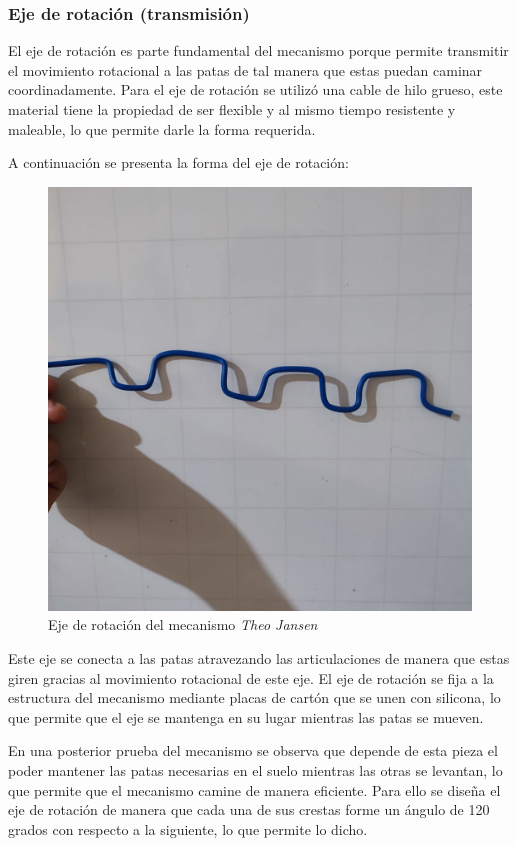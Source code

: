 \begin{multicols}{2}
  \subsubsection{Eje de rotación (transmisión)}

El eje de rotación es parte fundamental del mecanismo porque permite transmitir el movimiento rotacional a las patas de tal manera que estas puedan caminar coordinadamente. Para el eje de rotación se utilizó una cable de hilo grueso, este material tiene la propiedad de ser flexible y al mismo tiempo resistente y maleable, lo que permite darle la forma requerida. 

A continuación se presenta la forma del eje de rotación:

\begin{figure}[H]
  \centering
  \includegraphics[width=0.6\linewidth]{./assets/eje.jpeg}
  \caption{Eje de rotación del mecanismo \textit{Theo Jansen}}
  \label{fig:eje_rotacion}
\end{figure}

Este eje se conecta a las patas atravezando las articulaciones de manera que estas giren gracias al movimiento rotacional de este eje. El eje de rotación se fija a la estructura del mecanismo mediante placas de cartón que se unen con silicona, lo que permite que el eje se mantenga en su lugar mientras las patas se mueven.

En una posterior prueba del mecanismo se observa que depende de esta pieza el poder mantener las patas necesarias en el suelo mientras las otras se levantan, lo que permite que el mecanismo camine de manera eficiente. Para ello se diseña el eje de rotación de manera que cada una de sus crestas forme un ángulo de 120 grados con respecto a la siguiente, lo que permite lo dicho.


\end{multicols}
